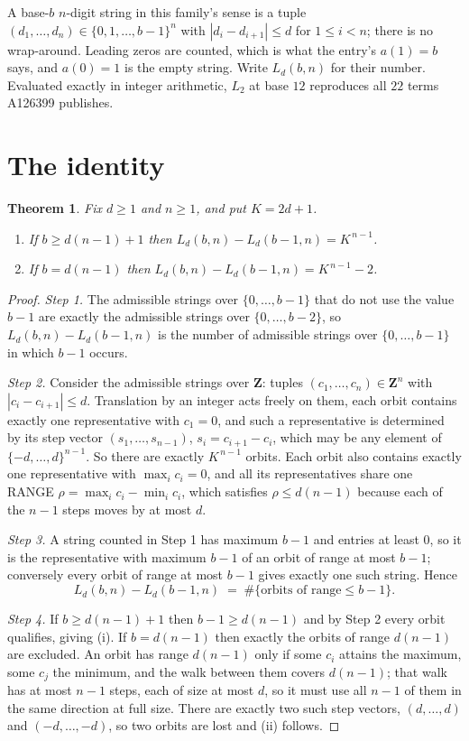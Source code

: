 \documentclass[11pt,a4paper]{article}
\theoremstyle{plain}
\newtheorem{theorem}{Theorem}
\theoremstyle{definition}
\begin{document}
A base-$b$ $n$-digit string in this family's sense is a tuple
$(d_1,\dots,d_n)\in\{0,1,\dots,b-1\}^{n}$ with $|d_i-d_{i+1}|\le d$ for $1\le i<n$; there
is no wrap-around. Leading zeros are counted, which is what the entry's $a(1)=b$ says, and
$a(0)=1$ is the empty string. Write $L_d(b,n)$ for their number. Evaluated exactly in integer
arithmetic, $L_{2}$ at base $12$ reproduces all $22$ terms A126399 publishes.

\section{The identity}

\begin{theorem}
Fix $d\ge1$ and $n\ge1$, and put $K=2d+1$.
\begin{enumerate}
\item[(i)] If $b\ge d(n-1)+1$ then $L_d(b,n)-L_d(b-1,n)=K^{\,n-1}$.
\item[(ii)] If $b=d(n-1)$ then $L_d(b,n)-L_d(b-1,n)=K^{\,n-1}-2$.
\end{enumerate}
\end{theorem}

\begin{proof}
\emph{Step 1.} The admissible strings over $\{0,\dots,b-1\}$ that do not use the value $b-1$
are exactly the admissible strings over $\{0,\dots,b-2\}$, so $L_d(b,n)-L_d(b-1,n)$ is the
number of admissible strings over $\{0,\dots,b-1\}$ in which $b-1$ occurs.

\emph{Step 2.} Consider the admissible strings over $\mathbf{Z}$: tuples
$(c_1,\dots,c_n)\in\mathbf{Z}^{n}$ with $|c_i-c_{i+1}|\le d$. Translation by an integer acts
freely on them, each orbit contains exactly one representative with $c_1=0$, and such a
representative is determined by its step vector $(s_1,\dots,s_{n-1})$, $s_i=c_{i+1}-c_i$,
which may be any element of $\{-d,\dots,d\}^{n-1}$. So there are exactly $K^{\,n-1}$ orbits.
Each orbit also contains exactly one representative with $\max_i c_i=0$, and all its
representatives share one RANGE $\rho=\max_ic_i-\min_ic_i$, which satisfies
$\rho\le d(n-1)$ because each of the $n-1$ steps moves by at most $d$.

\emph{Step 3.} A string counted in Step 1 has maximum $b-1$ and entries at least $0$, so it is
the representative with maximum $b-1$ of an orbit of range at most $b-1$; conversely every orbit
of range at most $b-1$ gives exactly one such string. Hence
\[
L_d(b,n)-L_d(b-1,n)\;=\;\#\{\text{orbits of range}\le b-1\} .
\]

\emph{Step 4.} If $b\ge d(n-1)+1$ then $b-1\ge d(n-1)$ and by Step 2 every orbit qualifies,
giving (i). If $b=d(n-1)$ then exactly the orbits of range $d(n-1)$ are excluded. An orbit has
range $d(n-1)$ only if some $c_i$ attains the maximum, some $c_j$ the minimum, and the walk
between them covers $d(n-1)$; that walk has at most $n-1$ steps, each of size at most $d$, so it
must use all $n-1$ of them in the same direction at full size. There are exactly two such step
vectors, $(d,\dots,d)$ and $(-d,\dots,-d)$, so two orbits are lost and (ii) follows.
\end{proof}
\end{document}

